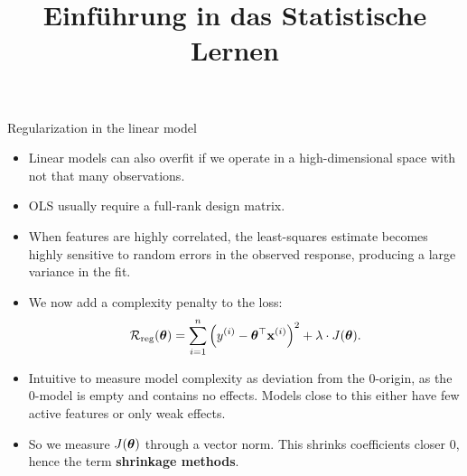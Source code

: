 



\newcommand{\titlefigure}{figure_man/ridge_hat.png}
\newcommand{\learninggoals}{
  \item Know the regularized linear model
  \item Know Ridge regression ($L2$ penalty)
  \item Know Lasso regression ($L1$ penalty)
}

\title{Einführung in das Statistische Lernen}
\date{}





\begin{vbframe}{Regularization in the linear model}

  \begin{itemize}
  \item Linear models can also overfit if we operate in a high-dimensional space with not that many observations.
  \item OLS usually require a full-rank design matrix.
  \item When features are highly correlated, the least-squares estimate becomes highly sensitive to random errors in the observed response, producing a large variance in the fit.
  \item We now add a complexity penalty to the loss:
  $$
  \mathcal{R}_{\text{reg}}(\bm{\theta}) = \sum\limits_{i=1}^n \left(y^{(i)} - \bm{\theta}^\top \mathbf{x}^{(i)} \right)^2 + \lambda \cdot J(\bm{\theta}).
  $$
  \item Intuitive to measure model complexity as deviation from the 0-origin, as the 0-model is empty and contains no effects. Models close to this either have few active features or only weak effects.
  \item So we measure $J(\bm{\theta})$ through a vector norm.
    This shrinks coefficients closer 0, hence the term \textbf{shrinkage methods}.
  \end{itemize}

\end{vbframe}



